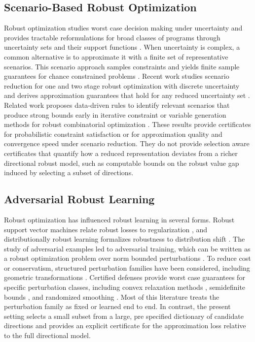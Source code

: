 \documentclass[accepted]{uai2026}
\theoremstyle{plain}
\theoremstyle{definition}
\theoremstyle{remark}
\begin{document}
\subsection{Scenario-Based Robust Optimization}
Robust optimization studies worst case decision making under uncertainty and provides tractable reformulations for broad classes of programs through uncertainty sets and their support functions \citep{BenTal1998, ElGhaoui1997}.
When uncertainty is complex, a common alternative is to approximate it with a finite set of representative scenarios. This scenario approach samples constraints and yields finite sample guarantees for chance constrained problems \citep{Calafiore2006, Campi2008}.
Recent work studies scenario reduction for one and two stage robust optimization with discrete uncertainty and derives approximation guarantees that hold for any reduced uncertainty set \citep{goerigk2023optimal}. Related work proposes data-driven rules to identify relevant scenarios that produce strong bounds early in iterative constraint or variable generation methods for robust combinatorial optimization \citep{goerigk2025data}.
These results provide certificates for probabilistic constraint satisfaction or for approximation quality and convergence speed under scenario reduction. They do not provide selection aware certificates that quantify how a reduced representation deviates from a richer directional robust model, such as computable bounds on the robust value gap induced by selecting a subset of directions.

\subsection{Adversarial Robust Learning}
Robust optimization has influenced robust learning in several forms. Robust support vector machines relate robust losses to regularization \citep{Xu2009}, and distributionally robust learning formalizes robustness to distribution shift \citep{Namkoong2016, Sinha2018}.
The study of adversarial examples \citep{Szegedy2014} led to adversarial training, which can be written as a robust optimization problem over norm bounded perturbations \citep{Goodfellow2015, Madry2018}. To reduce cost or conservatism, structured perturbation families have been considered, including geometric transformations \citep{Engstrom2019}.
Certified defenses provide worst case guarantees for specific perturbation classes, including convex relaxation methods \citep{Wong2018}, semidefinite bounds \citep{Raghunathan2018}, and randomized smoothing \citep{Cohen2019}.
Most of this literature treats the perturbation family as fixed or learned end to end. In contrast, the present setting selects a small subset from a large, pre specified dictionary of candidate directions and provides an explicit certificate for the approximation loss relative to the full directional model.
\end{document}
